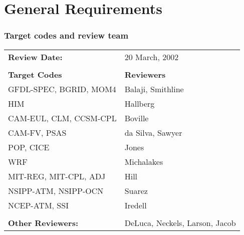 \documentclass[english]{article}
\begin{document}




\newpage
\tableofcontents

\newpage


\newpage
\begin{htmlonly}
\end{htmlonly}
\part{General Requirements}
\label{part:General_Requirements}

\section{Target codes and review team}

\begin{tabular}{l l}

{\bf Review Date:}          & 20 March, 2002 \\ \\

{\bf Target Codes}            & {\bf Reviewers} \\
GFDL-SPEC, BGRID, MOM4        & Balaji, Smithline \\ 
HIM                           & Hallberg \\
CAM-EUL, CLM, CCSM-CPL        & Boville \\
CAM-FV, PSAS                  & da Silva, Sawyer\\
POP, CICE                     & Jones \\
WRF                           & Michalakes \\
MIT-REG, MIT-CPL, ADJ         & Hill \\
NSIPP-ATM, NSIPP-OCN          & Suarez \\
NCEP-ATM, SSI                 & Iredell \\ \\


{\bf Other Reviewers:}        & DeLuca, Neckels, Larson, Jacob

\end{tabular}
\end{document}
